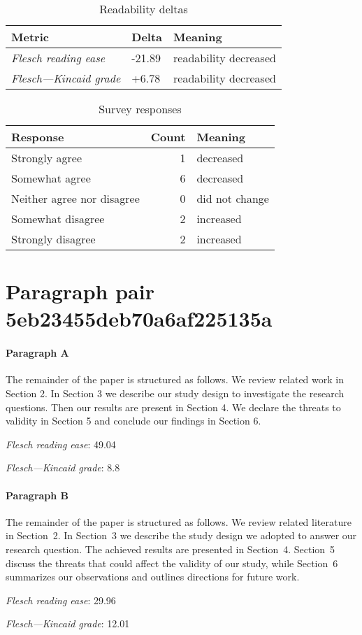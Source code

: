 \bigskip\begin{table}[!h]
\centering
\begin{tabular}{lll}
\toprule
               \textbf{Metric} & \textbf{Delta} &       \textbf{Meaning} \\
\midrule
    \emph{Flesch reading ease} &         -21.89 &  readability decreased \\
 \emph{Flesch---Kincaid grade} &          +6.78 &  readability decreased \\
\bottomrule
\end{tabular}
\caption*{Readability deltas}\end{table}

\begin{table}[!h]
\centering
\begin{tabular}{lrl}
\toprule
          \textbf{Response} &  \textbf{Count} & \textbf{Meaning} \\
\midrule
             Strongly agree &               1 &        decreased \\
             Somewhat agree &               6 &        decreased \\
 Neither agree nor disagree &               0 &   did not change \\
          Somewhat disagree &               2 &        increased \\
          Strongly disagree &               2 &        increased \\
\bottomrule
\end{tabular}
\caption*{Survey responses}\end{table}


\newpage
\section{Paragraph pair 5eb23455deb70a6af225135a}
\paragraph{Paragraph A}
The remainder of the paper is structured as follows. We review related work in Section 2. In Section 3 we describe our study design to investigate the research questions. Then our results are present in Section 4. We declare the threats to validity in Section 5 and conclude our findings in Section 6.\par\medskip
\emph{Flesch reading ease}: 49.04\par
\emph{Flesch---Kincaid grade}: 8.8

\paragraph{Paragraph B}
The remainder of the paper is structured as follows. We review related literature in Section 2. In Section 3 we describe the study design we adopted to answer our research question. The achieved results are presented in Section 4. Section 5 discuss the threats that could affect the validity of our study, while Section 6 summarizes our observations and outlines directions for future work.\par\medskip
\emph{Flesch reading ease}: 29.96\par
\emph{Flesch---Kincaid grade}: 12.01

